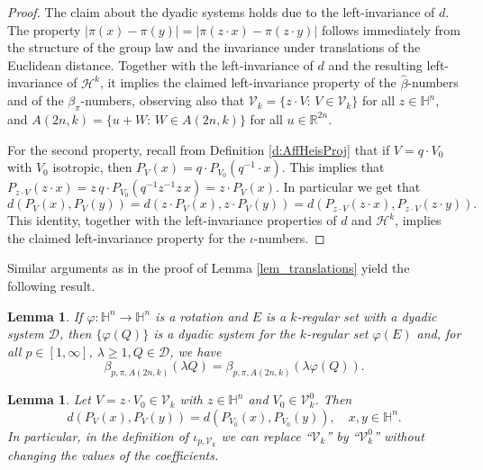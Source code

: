 \documentclass[12pt]{amsart}
\numberwithin{equation}{section}
\theoremstyle{plain}
\newtheorem{lemma}[theorem]{Lemma}
\theoremstyle{definition}
\theoremstyle{remark}
\begin{document}
\begin{proof}
The claim about the dyadic systems holds due to the left-invariance of $d$. 
     The property $|\pi(x)-\pi(y)|=|\pi(z\cdot x)-\pi(z\cdot y)|$ follows immediately from the structure of the group law and the invariance under translations of the Euclidean distance.
     Together with the left-invariance of $d$ and the resulting left-invariance of $\mathcal{H}^k$, it implies the claimed left-invariance property of the $\widehat \beta$-numbers and of the $\beta_{\pi}$-numbers, observing also that $\mathcal{V}_k =\{z\cdot V:\, V\in \mathcal{V}_k\}$ for all $z\in \mathbb{H}^n$, and $A(2n,k)=\{u+ W:\, W\in A(2n,k)\}$ for all $u\in \mathbb{R}^{2n}$.
     
     
 For the second property, recall from Definition \ref{d:AffHeisProj} that if $V=q\cdot V_0$ with $V_0$ isotropic, then $P_V(x)=q\cdot P_{V_0}(q^{-1}\cdot x)$. This implies that $P_{z\cdot V}(z\cdot x)=z\, q\cdot P_{V_0}(q^{-1}z^{-1}z\,x)=z\cdot P_V(x).$ In particular we get that
  \begin{equation}\label{eq_transinv}d(P_V(x),P_V(y))=d(z\cdot P_V(x),z\cdot P_V(y))=d(P_{z\cdot V}(z\cdot x),P_{z\cdot V}(z\cdot y)).\end{equation}
  This identity, together with the left-invariance properties  of $d$ and  $\mathcal{H}^k$, implies the claimed left-invariance property for the $\iota$-numbers. 
\end{proof}

Similar arguments as in the proof of Lemma \ref{lem_translations} yield the following result.

\begin{lemma}\label{l:RotInv}
    If $\varphi:\mathbb{H}^n\to \mathbb{H}^n$ is a rotation and $E$ is a $k$-regular set with a dyadic system $\mathcal{D}$, then $\{\varphi(Q)\}$ is a dyadic system for the $k$-regular set $\varphi( E)$ and, for all $p\in [1,\infty]$, $\lambda\geq 1, Q\in \mathcal{D}$, we have
  \[ \beta_{p,\pi,A(2n,k)}(\lambda Q)=\beta_{p,\pi,A(2n,k)}(\lambda \varphi( Q)).\]
\end{lemma}


\begin{lemma}\label{l:NonAffineProj}
Let $V= z \cdot V_0 \in \mathcal{V}_k$ with $z\in \mathbb{H}^n$ and $V_0 \in \mathcal{V}_k^0$. Then
\begin{displaymath}
    d(P_V(x),P_V(y))=d(P_{V_0}(x),P_{V_0}(y)),\quad x,y\in\mathbb{H}^n.
\end{displaymath}
In particular, in the definition of $\iota_{p,\mathcal{V}_k}$ we can replace ``$\mathcal{V}_k$'' by ``$\mathcal{V}_k^0$'' without changing the values of the coefficients. 
\end{lemma}
\end{document}
